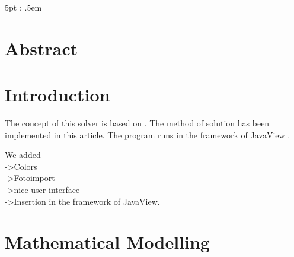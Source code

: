 \documentclass[a4paper,10pt,oneside,final,german,openbib,pdftex,titlepage]{scrbook}
\begin{document}
\mainmatter
\sloppy

    {\topsep}             %
    {5pt}             %
    {\itshape}         %
    {\parindent}       %
    {\bfseries}        %
    {:}                %
    {.5em}             %
    {}                 %

\theoremstyle{test333}
\newtheorem{test333}{TEST}
\newtheorem{thm}{Theorem}


\theoremstyle{theorem}%
\newtheorem{Lem}[thm]{Lemma}
\newtheorem{Cor}[thm]{Corollary}
\newtheorem{Def}[thm]{Definition}

\theoremstyle{definition}
\newtheorem{Rem}[thm]{Remark}
\newtheorem{State}[subsection]{\#}



\makeatletter
\g@addto@macro{\thm@space@setup}{\thm@headpunct{:}}
\makeatother

\setcounter{chapter}{-1}
\chapter{Abstract}
\chapter{Introduction}

The concept of this solver is based on \cite{Stam}. The method of solution has been implemented in this article.
The program runs in the framework of JavaView \cite{JavaView}.

We added\\
 ->Colors\\
 ->Fotoimport\\
 ->nice user interface\\
 ->Insertion in the framework of JavaView.
 
\chapter{Mathematical Modelling} \label{Section:Mathematical Modelling}
\end{document}
